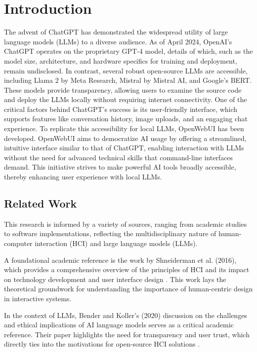 \documentclass[sigconf, nonacm]{acmart}
\begin{document}
\section{Introduction}
The advent of ChatGPT has demonstrated the widespread utility of large language models (LLMs) to a diverse audience. As of April 2024, OpenAI's ChatGPT operates on the proprietary GPT-4 model, details of which, such as the model size, architecture, and hardware specifics for training and deployment, remain undisclosed. In contrast, several robust open-source LLMs are accessible, including Llama 2 by Meta Research, Mistral by Mistral AI, and Google's BERT. These models provide transparency, allowing users to examine the source code and deploy the LLMs locally without requiring internet connectivity. One of the critical factors behind ChatGPT's success is its user-friendly interface, which supports features like conversation history, image uploads, and an engaging chat experience. To replicate this accessibility for local LLMs, OpenWebUI has been developed. OpenWebUI aims to democratize AI usage by offering a streamlined, intuitive interface similar to that of ChatGPT, enabling interaction with LLMs without the need for advanced technical skills that command-line interfaces demand. This initiative strives to make powerful AI tools broadly accessible, thereby enhancing user experience with local LLMs.

\subsection{Related Work}
This research is informed by a variety of sources, ranging from academic studies to software implementations, reflecting the multidisciplinary nature of human-computer interaction (HCI) and large language models (LLMs).

A foundational academic reference is the work by Shneiderman et al. (2016), which provides a comprehensive overview of the principles of HCI and its impact on technology development and user interface design \cite{shneiderman2016designing}. This work lays the theoretical groundwork for understanding the importance of human-centric design in interactive systems.

In the context of LLMs, Bender and Koller's (2020) discussion on the challenges and ethical implications of AI language models serves as a critical academic reference. Their paper highlights the need for transparency and user trust, which directly ties into the motivations for open-source HCI solutions \cite{bender2020climbing}.
\end{document}
